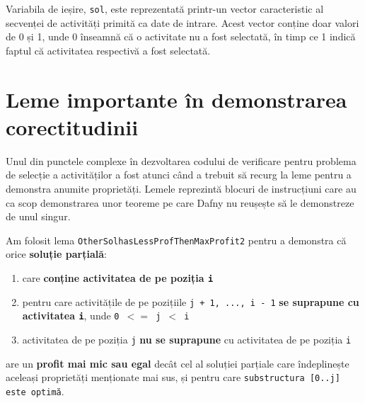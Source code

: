Variabila de ieșire, \texttt{sol}, este reprezentată printr-un vector caracteristic al secvenței de activități primită ca date de intrare. Acest vector conține doar valori de 0 și 1, unde 0 înseamnă că o activitate nu a fost selectată, în timp ce 1 indică faptul că activitatea respectivă a fost selectată.

\section{Leme importante în demonstrarea corectitudinii}
Unul din punctele complexe în dezvoltarea codului de verificare pentru problema de selecție a activităților a fost atunci când a trebuit să recurg la leme pentru a demonstra anumite proprietăți. Lemele reprezintă blocuri de instrucțiuni care au ca scop demonstrarea unor teoreme pe care Dafny nu reușește să le demonstreze de unul singur.

Am folosit lema \texttt{OtherSolhasLessProfThenMaxProfit2} pentru a demonstra că orice \textbf{soluție parțială}:
\begin{enumerate}
    \item care \textbf{conține activitatea de pe poziția \texttt{i}}
    \item pentru care activitățile de pe pozițiile \texttt{j + 1, ..., i - 1} \textbf{se suprapune cu activitatea \texttt{i}}, unde \texttt{0 $<=$ j $<$ i}
    \item activitatea de pe poziția \texttt{j} \textbf{nu se suprapune} cu activitatea de pe poziția \texttt{i} 
\end{enumerate}
are un \textbf{profit mai mic sau egal} decât cel al soluției parțiale care îndeplinește aceleași proprietăți menționate mai sus, și pentru care \texttt{substructura [0..j] este optimă}. 

